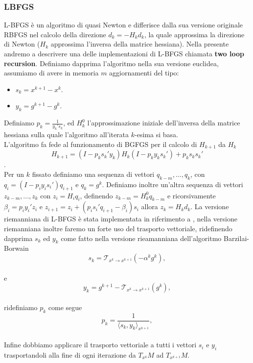 \documentclass[a4paper, 12pt]{article}
\begin{document}
\subsubsection{LBFGS}
L-BFGS è un algoritmo di quasi Newton e differisce dalla sua versione originale RBFGS nel calcolo della direzione $d_k = -H_kd_k$, la quale approssima la direzione di Newton ($H_k$ approssima l'inversa della matrice hessiana). Nella presente andremo a descrivere una delle implementazioni di L-BFGS chiamata \textbf{two loop recursion}. Definiamo dapprima l'algoritmo nella sua versione euclidea, assumiamo di avere in memoria $m$ aggiornamenti del tipo:\\
\begin{itemize}
    \item $s_k = x^{k+1} - x^k$.
    \item $y_k = g^{k+1} - g^k$.
\end{itemize}
Definiamo $p_k = \frac{1}{y_k's_k}$, ed $H_k^0$ l'approssimazione iniziale dell'inversa della matrice hessiana sulla quale l'algoritmo all'iterata $k$-esima si basa.\\
L'algoritmo fa fede al funzionamento di BGFGS per il calcolo di $H_{k+1}$ da $H_k$\\
\[H_{k+1} = (I - p_ks_k'y_k)H_k(I - p_ky_ks_k') + p_ks_ks_k'\].\\
Per un $k$ fissato definiamo una sequenza di vettori $q_{k-m}, ..., q_k$, con $q_i = (I - p_iy_is_i')q_{i+1}$ e $q_k = g^k$. Definiamo inoltre un'altra sequenza di vettori $z_{k-m}, ..., z_k$ con $z_i = H_iq_i$, definendo $z_{k-m} = H_k^0q_{k-m}$ e ricorsivamente $\beta_i = p_iy_i'z_i$ e $z_{i+1} = z_i + (p_is_i'q_{i+1} - \beta_i)s_i$ allora $z_k = H_kd_k$.
La versione riemanniana di L-BFGS è stata implementata in riferimento a \cite{A Broyden Class of Quasi-Newton Methods for Riemannian Optimization}, nella versione riemanniana inoltre faremo un forte uso del trasporto vettoriale, ridefinendo dapprima $s_k$ ed $y_k$ come fatto nella versione rieamanniana dell'algoritmo Barzilai-Borwain\\
\[s_k = \mathcal{T}_{x^k \to x^{k+1}}(-\alpha^kg^k),\]\\
e\\
\[y_k = g^{k+1} - \mathcal{T}_{x^k \to x^{k+1}}(g^k),\]\\
ridefiniamo $p_k$ come segue\\
\[p_k = \frac{1}{\langle s_k,y_k \rangle_{x^{k+1}}},\]\\
Infine dobbiamo applicare il trasporto vettoriale a tutti i vettori $s_i$ e $y_i$ trasportandoli alla fine di ogni iterazione da $T_{x^k}M$ ad $T_{x^{k+1}}M$.\\
\end{document}
